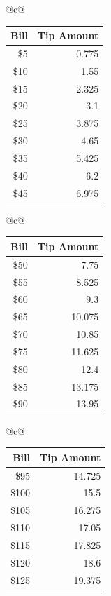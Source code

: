 \begin{sol}

\begin{center}
\begin{tabular}[t]{@{}c@{}}
\small\setlength{\tabcolsep}{5pt}
\begin{tabular}[t]{rr}
\hline
\textbf{Bill} & \textbf{Tip Amount} \\
\hline
\$5 & 0.775 \\
\$10 & 1.55 \\
\$15 & 2.325 \\
\$20 & 3.1 \\
\$25 & 3.875 \\
\$30 & 4.65 \\
\$35 & 5.425 \\
\$40 & 6.2 \\
\$45 & 6.975 \\
\hline
\end{tabular}
\end{tabular}
\qquad
\begin{tabular}[t]{@{}c@{}}
\small\setlength{\tabcolsep}{5pt}
\begin{tabular}[t]{rr}
\hline
\textbf{Bill} & \textbf{Tip Amount} \\
\hline
\$50 & 7.75 \\
\$55 & 8.525 \\
\$60 & 9.3 \\
\$65 & 10.075 \\
\$70 & 10.85 \\
\$75 & 11.625 \\
\$80 & 12.4 \\
\$85 & 13.175 \\
\$90 & 13.95 \\
\hline
\end{tabular}
\end{tabular}
\qquad
\begin{tabular}[t]{@{}c@{}}
\small\setlength{\tabcolsep}{5pt}
\begin{tabular}[t]{rr}
\hline
\textbf{Bill} & \textbf{Tip Amount} \\
\hline
\$95 & 14.725 \\
\$100 & 15.5 \\
\$105 & 16.275 \\
\$110 & 17.05 \\
\$115 & 17.825 \\
\$120 & 18.6 \\
\$125 & 19.375 \\
\hline
\end{tabular}
\end{tabular}
\end{center}
\end{sol}


